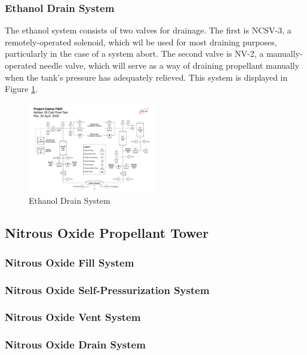 \documentclass[9pt]{article} %
\numberwithin{equation}{section} %
\begin{document}
\subsubsection{Ethanol Drain System}
\hspace{\parindent} The ethanol system consists of two valves for drainage. The first is NCSV-3, a remotely-operated solenoid, which wil be used for most draining purposes, particularly in the case of a system abort. The second valve is NV-2, a manually-operated needle valve, which will serve as a way of draining propellant manually when the tank's pressure has adequately relieved. This system is displayed in Figure \ref{fig:ethanol_drain_system}.

\begin{figure}[!htb] 
    \centering
    \includegraphics[scale=0.5, width=0.5\textwidth, trim={7cm 7cm 28cm 19.2cm}, clip]{Aphlex1B_04-02-2020_P&ID.pdf} %
    \caption{Ethanol Drain System}
    \label{fig:ethanol_drain_system}
\end{figure}

\subsection{Nitrous Oxide Propellant Tower}
\subsubsection{Nitrous Oxide Fill System}
\subsubsection{Nitrous Oxide Self-Pressurization System}
\subsubsection{Nitrous Oxide Vent System}
\subsubsection{Nitrous Oxide Drain System}
\end{document}
